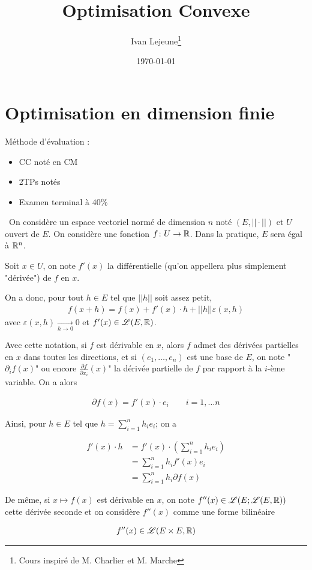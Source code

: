 \documentclass[french,a4paper,10pt]{article}
\title{\color{astral} \sffamily \bfseries Optimisation Convexe}
\author{Ivan Lejeune\thanks{Cours inspiré de M. Charlier et M. Marche}}
\date{\today}
\begin{document}
	
	\maketitle
	\section{Optimisation en dimension finie}
	\begin{oc-intro}
		Méthode d'évaluation :
		\begin{itemize}
			\item CC noté en CM
			\item 2TPs notés
			\item Examen terminal à 40\%
		\end{itemize}
	\end{oc-intro}
	
	\begin{oc-notation}\,
		On considère un espace vectoriel normé de dimension $n$ noté $(E, ||\cdot||)$ et $U$ ouvert de $E$. On considère une fonction $f\colon U\to \mathbb{R}$. Dans la pratique, $E$ sera égal à $\mathbb{R}^n$. 
		
		Soit $x\in U$, on note $f'(x)$ la différentielle (qu'on appellera plus simplement "dérivée") de $f$ en $x$. 
		
		On a donc, pour tout $h\in E$ tel que $||h||$ soit assez petit, 
		\[\begin{aligned}
			f(x+h)=f(x)+f'(x)\cdot h+||h||\varepsilon(x, h)
		\end{aligned}\]
		avec $\varepsilon(x, h)\underset{h\to 0}\to 0$
		et $f'(x)\in\mathscr{L}(E, \mathbb{R})$.
		
		Avec cette notation, si $f$ est dérivable en $x$, alors $f$ admet des dérivées partielles en $x$ dans toutes les directions, et si $(e_1,\dots,e_n)$ est une base de $E$, on note "$\partial_i f(x)$" ou encore $\frac{\partial f}{\partial x_i}(x)$" la dérivée partielle de $f$ par rapport à la $i$-ème variable. On a alors
		
		\[\begin{aligned}
			\partial f(x)=f'(x)\cdot e_i\qquad i=1,\dots n
		\end{aligned}\]
		
		Ainsi, pour $h\in E$ tel que $h=\sum_{i=1}^nh_ie_i$; on a
		
		\[\begin{aligned}
			f'(x)\cdot h &= f'(x)\cdot\left(\sum_{i=1}^nh_ie_i\right)\\
			&=\sum_{i=1}^n h_i f'(x) e_i\\
			&=\sum_{i=1}^{n} h_i\partial f(x)
		\end{aligned}\]
		
		De même, si $x\mapsto f(x)$ est dérivable en $x$, on note $f''(x)\in\mathscr{L}(E;\mathscr{L}(E, \mathbb{R}))$ cette dérivée seconde et on considère $f''(x)$ comme une forme bilinéaire 
		
		\[\begin{aligned}
			f''(x)\in\mathscr{L}(E\times E,\mathbb{R})
		\end{aligned}\]
	\end{oc-notation}
	
\end{document}
